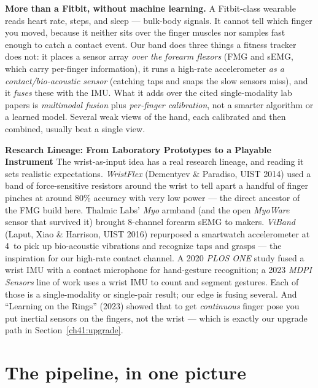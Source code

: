 \begin{aestheticbox}
\textbf{More than a Fitbit, without machine learning.} A Fitbit-class wearable
reads heart rate, steps, and sleep --- bulk-body signals. It cannot tell which
finger you moved, because it neither sits over the finger muscles nor samples
fast enough to catch a contact event. Our band does three things a fitness
tracker does not: it places a sensor array \emph{over the forearm flexors} (FMG
and sEMG, which carry per-finger information), it runs a high-rate accelerometer
\emph{as a contact/bio-acoustic sensor} (catching taps and snaps the slow
sensors miss), and it \emph{fuses} these with the IMU. What it adds over the cited
single-modality lab papers is \emph{multimodal fusion} plus
\emph{per-finger calibration}, not a smarter algorithm or a learned
model. Several weak views of the hand, each calibrated and then combined,
usually beat a single view.
\end{aestheticbox}

\begin{applicationbox}
\textbf{Research Lineage: From Laboratory Prototypes to a Playable Instrument}
The wrist-as-input idea has a real research lineage, and reading it sets
realistic expectations. \emph{WristFlex} (Dementyev \& Paradiso, UIST 2014) used
a band of force-sensitive resistors around the wrist to tell apart a handful of
finger pinches at around 80\% accuracy with very low power --- the direct
ancestor of
the FMG build here. Thalmic Labs' \emph{Myo} armband (and the open
\emph{MyoWare} sensor that survived it) brought 8-channel forearm sEMG to
makers. \emph{ViBand} (Laput, Xiao \& Harrison, UIST 2016) repurposed a
smartwatch accelerometer at 4\, to pick up bio-acoustic vibrations and
recognize taps and grasps --- the inspiration for our high-rate contact channel.
A 2020 \emph{PLOS ONE} study fused a wrist IMU with a contact microphone for
hand-gesture recognition; a 2023 \emph{MDPI Sensors} line of work uses a wrist
IMU to count and segment gestures. Each of those is a single-modality or
single-pair result; our edge is fusing several. And ``Learning on the Rings''
(2023) showed that to get \emph{continuous} finger pose you put inertial sensors
on the fingers, not the wrist --- which is exactly our upgrade path in
Section~\ref{ch41:upgrade}.
\end{applicationbox}

\section{The pipeline, in one picture}
\label{ch41:pipeline}


